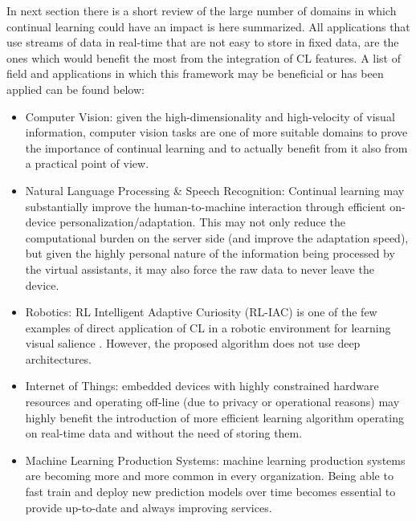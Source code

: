 \documentclass[english, LaM, oneside]{sapthesis}%
\begin{document}
In next section there is a short review of the large number of domains in which continual learning could have an impact is here summarized. All applications that use streams of data in real-time that are not easy to store in fixed data, are the ones which would benefit the most from the integration of CL features. A list of field and applications in which this framework may be beneficial or has been applied can be found below:
\begin{itemize}
    \item Computer Vision: given the high-dimensionality and high-velocity of visual information, computer vision tasks are one of more suitable domains to prove the importance of continual learning and to actually benefit from it also from a practical point of view.
    \item Natural Language Processing & Speech Recognition: Continual learning may substantially improve the human-to-machine interaction through efficient on-device personalization/adaptation. This may not only reduce the computational burden on the server side (and improve the adaptation speed), but given the highly personal nature of the information being processed by the virtual assistants, it may also force the raw data to never leave the device.
    \item Robotics: RL Intelligent Adaptive Curiosity (RL-IAC) is one of the few examples of direct application of CL in a robotic environment for learning visual salience \cite{creaye}. However, the proposed algorithm does not use deep architectures.
    \item Internet of Things: embedded devices with highly constrained hardware resources and operating off-line (due to privacy or operational reasons) may highly benefit the introduction of more efficient learning algorithm operating on real-time data and without the need of storing them. 
    \item Machine Learning Production Systems: machine learning production systems are becoming more and more common in every organization. Being able to fast train and deploy new prediction models over time becomes essential to provide up-to-date and always improving services. 
\end{itemize}
\end{document}
